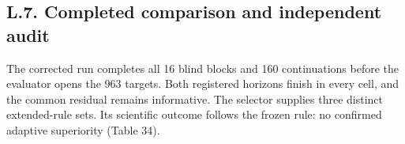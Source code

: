 \documentclass[pdflatex,sn-basic,Numbered]{sn-jnl}
\begin{document}
\subsection*{L.7. Completed comparison and independent audit}\label{l.7.-completed-comparison-and-independent-audit}

The corrected run completes all 16 blind blocks and 160 continuations before the evaluator opens the 963 targets. Both registered horizons finish in every cell, and the common residual remains informative. The selector supplies three distinct extended-rule sets. Its scientific outcome follows the frozen rule: no confirmed adaptive superiority (Table 34).

\begingroup
\small
\setlength{\tabcolsep}{3pt}
\renewcommand{\arraystretch}{1.13}
\end{document}
